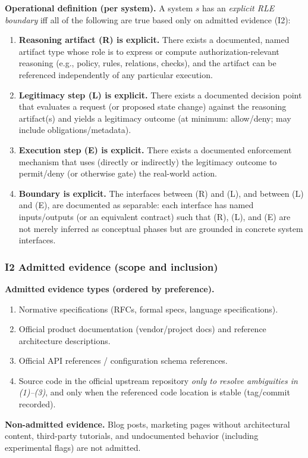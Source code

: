 \textbf{Operational definition (per system).} A system $s$ has an \emph{explicit RLE boundary} iff all of the following are true based only on admitted evidence (I2):
\begin{enumerate}
  \item \textbf{Reasoning artifact (R) is explicit.} There exists a documented, named artifact type whose role is to express or compute authorization-relevant reasoning (e.g., policy, rules, relations, checks), and the artifact can be referenced independently of any particular execution.
  \item \textbf{Legitimacy step (L) is explicit.} There exists a documented decision point that evaluates a request (or proposed state change) against the reasoning artifact(s) and yields a legitimacy outcome (at minimum: allow/deny; may include obligations/metadata).
  \item \textbf{Execution step (E) is explicit.} There exists a documented enforcement mechanism that uses (directly or indirectly) the legitimacy outcome to permit/deny (or otherwise gate) the real-world action.
  \item \textbf{Boundary is explicit.} The interfaces between (R) and (L), and between (L) and (E), are documented as separable: each interface has named inputs/outputs (or an equivalent contract) such that (R), (L), and (E) are not merely inferred as conceptual phases but are grounded in concrete system interfaces.
\end{enumerate}

\subsubsection{I2 Admitted evidence (scope and inclusion)}
\textbf{Admitted evidence types (ordered by preference).}
\begin{enumerate}
  \item Normative specifications (RFCs, formal specs, language specifications).
  \item Official product documentation (vendor/project docs) and reference architecture descriptions.
  \item Official API references / configuration schema references.
  \item Source code in the official upstream repository \emph{only to resolve ambiguities in (1)--(3)}, and only when the referenced code location is stable (tag/commit recorded).
\end{enumerate}

\textbf{Non-admitted evidence.} Blog posts, marketing pages without architectural content, third-party tutorials, and undocumented behavior (including experimental flags) are not admitted.

